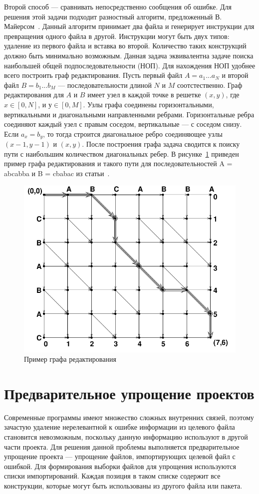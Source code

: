 Второй способ --- сравнивать непосредственно сообщения об ошибке. Для решения этой задачи подходит разностный алгоритм, предложенный В. Майерсом~\cite{myers1986ano}. Данный алгоритм принимает два файла и генерирует инструкции для превращения одного файла в другой. Инструкции могут быть двух типов: удаление из первого файла и вставка во второй. Количество таких конструкций должно быть минимально возможным. Данная задача эквивалентна задаче поиска наибольшей общей подпоследовательности (НОП). Для нахождения НОП удобнее всего построить граф редактирования. Пусть первый файл $A = a_1...a_N$ и второй файл $B = b_1...b_M$ --- последовательности длиной $N$ и $M$ соотстественно. Граф редактирования для $A$ и $B$ имеет узел в каждой точке в решетке $(x, y)$, где $x \in [0, N]$, и $у \in [0, M]$. Узлы графа соединены горизонтальными, вертикальными и диагональными направленными ребрами. Горизонтальные ребра соединяют каждый узел с правым соседом, вертикальные --- с соседом снизу. Если $a_x = b_y$, то тогда строится диагональное ребро соединяющее узлы $(x-1, y-1)$ и $(x, y)$. После построения графа задача сводится к поиску пути с наибольшим количеством диагональных ребер.
В рисунке~\ref{ex:lcs} приведен пример графа редактирования и такого пути для последовательностей A = abcabba и B = cbabac из статьи~\cite{myers1986ano}.
\begin{figure}	
		\includegraphics[width=0.99\linewidth]{fig/lcsexample} 
		\caption{\label{ex:lcs}Пример графа редактирования}
\end{figure}

\section{Предварительное упрощение проектов}
Современные программы имеют множество сложных внутренних связей, поэтому зачастую удаление нерелевантной к ошибке информации из целевого файла становится невозможным, поскольку данную информацию используют в другой части проекта. Для решения данной проблемы выполняется предварительное упрощение проекта --- упрощение файлов, импортирующих целевой файл с ошибкой. Для формирования выборки файлов для упрощения используются списки импортирований. Каждая позиция в таком списке содержит все конструкции, которые могут быть использованы из другого файла или пакета. 

